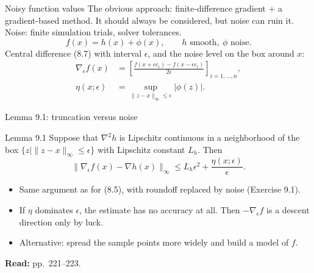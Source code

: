\documentclass[12pt,aspectratio=169]{beamer}
\newcommand{\readpp}[1]{{\color{red!80!black}\textbf{Read:} #1}}
\newcommand{\eps}{\epsilon}
\begin{document}
\begin{frame}{Noisy function values}
  The obvious approach: finite-difference gradient + a gradient-based method.
  It should always be considered, but noise can ruin it.
  Noise: finite simulation trials, solver tolerances.
  \begin{equation}
    f(x) = h(x)+\phi(x), \qquad h \text{ smooth},\ \phi \text{ noise}. \tag{9.2}
  \end{equation}
  Central difference (8.7) with interval $\eps$, and the noise level on the box around $x$:
  \begin{align}
    \nabla_\eps f(x) &= \left[\frac{f(x+\eps e_i)-f(x-\eps e_i)}{2\eps}\right]_{i=1,\dots,n}, \tag{9.3}\\
    \eta(x;\eps) &= \sup_{\|z-x\|_\infty\le\eps}|\phi(z)|. \tag{9.4}
  \end{align}
\end{frame}

\begin{frame}{Lemma 9.1: truncation versus noise}
  \begin{block}{Lemma 9.1}
    Suppose that $\nabla^2 h$ is Lipschitz continuous in a neighborhood of the box
    $\{z \mid \|z-x\|_\infty\le\eps\}$ with Lipschitz constant $L_h$. Then
    \begin{equation}
      \|\nabla_\eps f(x)-\nabla h(x)\|_\infty \le L_h\eps^2 + \frac{\eta(x;\eps)}{\eps}. \tag{9.5}
    \end{equation}
  \end{block}
  \begin{itemize}
    \item Same argument as for (8.5), with roundoff replaced by noise (Exercise 9.1).
    \item If $\eta$ dominates $\eps$, the estimate has no accuracy at all.
      Then $-\nabla_\eps f$ is a descent direction only by luck.
    \item Alternative: spread the sample points more widely and build a \alert{model} of $f$.
  \end{itemize}
  \readpp{pp.~221--223.}
\end{frame}
\end{document}
